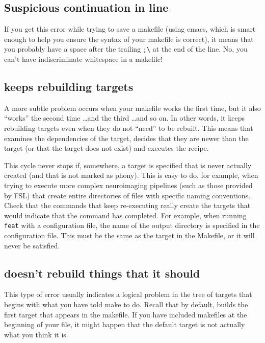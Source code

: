\subsection{Suspicious continuation in line \mypound{}} %

If you get this error while trying to save a makefile (using emacs, which is smart enough to help you ensure the syntax of your makefile is correct), it means that you probably have a space after the trailing \texttt{;\textbackslash} at the end of the line. No, you can't have indiscriminate whitespace in a makefile!

\subsection{\maken{} keeps rebuilding targets}

A more subtle problem occurs when your makefile works the first time, but it also ``works'' the second time \ldots and the third \ldots and so on. In other words, it keeps rebuilding targets even when they do not ``need'' to be rebuilt. This means that \maken{} examines the dependencies of the target, decides that they are newer than the target (or that the target does not exist) and executes the recipe.

This cycle never stops if, somewhere, a target is specified that is never actually created (and that is not marked as phony). This is easy to do, for example, when trying to execute more complex neuroimaging pipelines (such as those provided by FSL) that create entire directories of files with specific naming conventions. Check that the commands that keep re-executing really create the targets that would indicate that the command has completed. For example, when running \texttt{feat} with a configuration file, the name of the output directory is specified in the configuration file. This must be the same as the target in the Makefile, or it will never be satisfied.

\subsection{\maken{} doesn't rebuild things that it should}

This type of error usually indicates a logical problem in the tree of targets that begins with what you have told make to do. Recall that by default, \maken{} builds the first target that appears in the makefile. If you have included makefiles at the beginning of your file, it might happen that the default target is not actually what you think it is.
